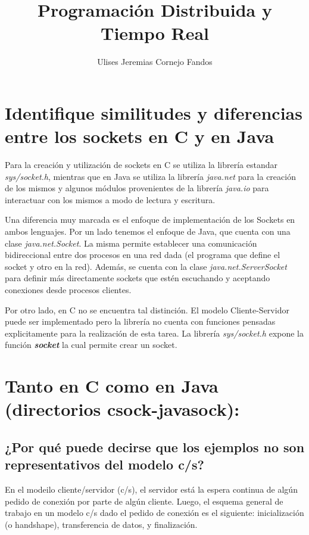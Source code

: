 \documentclass[osajnl,twocolumn,showpacs,superscriptaddress,10pt]{revtex4-1} %
\begin{document}
\title{Programación Distribuida y Tiempo Real}

\author{Ulises Jeremias Cornejo Fandos}

\maketitle %

\section{Identifique similitudes y diferencias entre los sockets en C y en Java}

Para la creación y utilización de sockets en C se utiliza la librería estandar \textit{sys/socket.h}, mientras que en Java se utiliza la librería \textit{java.net} para la creación de los mismos y algunos módulos provenientes de la librería \textit{java.io} para interactuar con los mismos a modo de lectura y escritura.

Una diferencia muy marcada es el enfoque de implementación de los Sockets en ambos lenguajes. Por un lado tenemos el enfoque de Java, que cuenta con una clase \textit{java.net.Socket}. La misma permite establecer una comunicación bidireccional entre dos procesos en una red dada (el programa que define el socket y otro en la red). Además, se cuenta con la clase \textit{java.net.ServerSocket} para definir más directamente sockets que estén escuchando y aceptando conexiones desde procesos clientes.

Por otro lado, en C no se encuentra tal distinción. El modelo Cliente-Servidor puede ser implementado pero la librería no cuenta con funciones pensadas explicitamente para la realización de esta tarea. La librería \textit{sys/socket.h} expone la función \textbf{\textit{socket}} la cual permite crear un socket.

\section{Tanto en C como en Java (directorios csock-javasock):}

\subsection{¿Por qué puede decirse que los ejemplos no son representativos del modelo c/s?}

En el modeilo cliente/servidor (c/s), el servidor está  la espera continua de algún pedido de conexión por parte de algún cliente. Luego, el esquema general de trabajo en un modelo c/s dado el pedido de conexión es el siguiente: inicialización (o handshape), transferencia de datos, y finalización.
\end{document}
